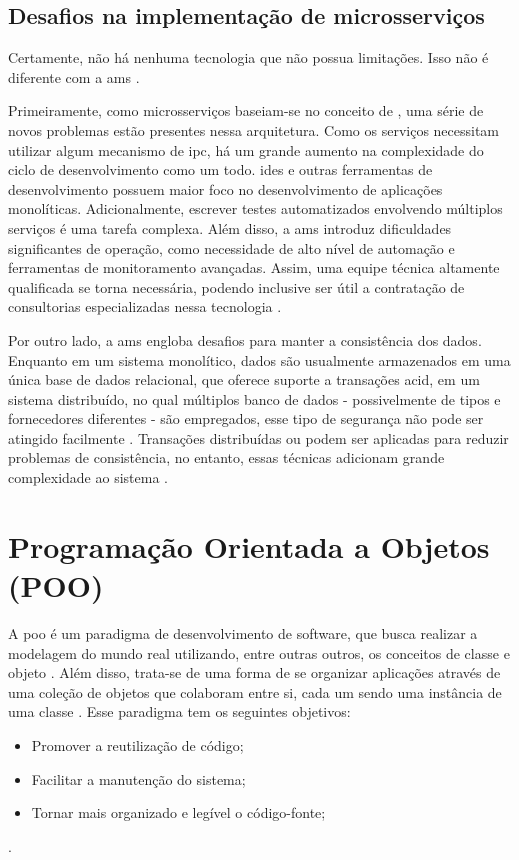 \subsection{Desafios na implementação de microsserviços}
Certamente, não há nenhuma tecnologia que não possua limitações. Isso não é diferente com a \acrlong{ams} \cite{richardson2018microservices}. 

Primeiramente, como microsserviços baseiam-se no conceito de , uma série de novos problemas estão presentes nessa arquitetura. Como os serviços necessitam utilizar algum mecanismo de \acrshort{ipc}, há um grande aumento na complexidade do ciclo de desenvolvimento como um todo. \acrshort{ide}s e outras ferramentas de desenvolvimento possuem maior foco no desenvolvimento de aplicações monolíticas. Adicionalmente, escrever testes automatizados envolvendo múltiplos serviços é uma tarefa complexa. Além disso, a \acrshort{ams} introduz dificuldades significantes de operação, como necessidade de alto nível de automação e ferramentas de monitoramento avançadas. Assim, uma equipe técnica altamente qualificada se torna necessária, podendo inclusive ser útil a contratação de consultorias especializadas nessa tecnologia \cite{richardson2018microservices}.

Por outro lado, a \acrfull{ams} engloba desafios para manter a consistência dos dados. Enquanto em um sistema monolítico, dados são usualmente armazenados em uma única base de dados relacional, que oferece suporte a transações \acrshort{acid}, em um sistema distribuído, no qual múltiplos banco de dados - possivelmente de tipos e fornecedores diferentes - são empregados, esse tipo de segurança não pode ser atingido facilmente \cite{buildingMicroservices}. Transações distribuídas ou  podem ser aplicadas para reduzir problemas de consistência, no entanto, essas técnicas adicionam grande complexidade ao sistema \cite{buildingMicroservices}.

\section{Programação Orientada a Objetos (POO)} 
A \acrfull{poo} é um paradigma de desenvolvimento de software, que busca realizar a modelagem do mundo real utilizando, entre outras outros, os conceitos de classe e objeto \cite{aragao2013java}. Além disso, trata-se de uma forma de se organizar aplicações através de uma coleção de objetos que colaboram entre si, cada um sendo uma instância de uma classe \cite{booch2006}. Esse paradigma tem os seguintes objetivos:
\begin{itemize}
    \item Promover a reutilização de código;
    \item Facilitar a manutenção do sistema;
    \item Tornar mais organizado e legível o código-fonte;
\end{itemize}
\cite{aragao2013java}.

